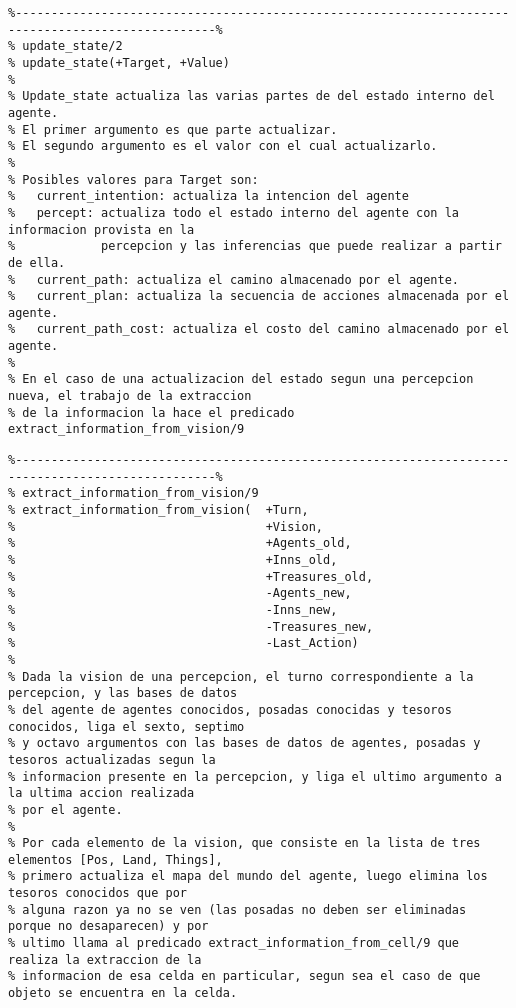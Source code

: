 \documentclass[a4paper,12pt]{report}
\begin{document}
\begin{scriptsize}
\begin{verbatim}
%--------------------------------------------------------------------------------------------------%
% update_state/2
% update_state(+Target, +Value)
% 
% Update_state actualiza las varias partes de del estado interno del agente.
% El primer argumento es que parte actualizar.
% El segundo argumento es el valor con el cual actualizarlo.
%
% Posibles valores para Target son:
%   current_intention: actualiza la intencion del agente
%   percept: actualiza todo el estado interno del agente con la informacion provista en la
%            percepcion y las inferencias que puede realizar a partir de ella.
%   current_path: actualiza el camino almacenado por el agente.
%   current_plan: actualiza la secuencia de acciones almacenada por el agente.
%   current_path_cost: actualiza el costo del camino almacenado por el agente.
%
% En el caso de una actualizacion del estado segun una percepcion nueva, el trabajo de la extraccion
% de la informacion la hace el predicado extract_information_from_vision/9
\end{verbatim}
\end{scriptsize}
        
\begin{scriptsize}
\begin{verbatim}
%--------------------------------------------------------------------------------------------------%
% extract_information_from_vision/9
% extract_information_from_vision(  +Turn,
%                                   +Vision,
%                                   +Agents_old,
%                                   +Inns_old,
%                                   +Treasures_old,
%                                   -Agents_new,
%                                   -Inns_new,
%                                   -Treasures_new,
%                                   -Last_Action)
% 
% Dada la vision de una percepcion, el turno correspondiente a la percepcion, y las bases de datos 
% del agente de agentes conocidos, posadas conocidas y tesoros conocidos, liga el sexto, septimo
% y octavo argumentos con las bases de datos de agentes, posadas y tesoros actualizadas segun la 
% informacion presente en la percepcion, y liga el ultimo argumento a la ultima accion realizada 
% por el agente.
%
% Por cada elemento de la vision, que consiste en la lista de tres elementos [Pos, Land, Things],
% primero actualiza el mapa del mundo del agente, luego elimina los tesoros conocidos que por
% alguna razon ya no se ven (las posadas no deben ser eliminadas porque no desaparecen) y por
% ultimo llama al predicado extract_information_from_cell/9 que realiza la extraccion de la 
% informacion de esa celda en particular, segun sea el caso de que objeto se encuentra en la celda.
\end{verbatim}
\end{scriptsize}
\end{document}
